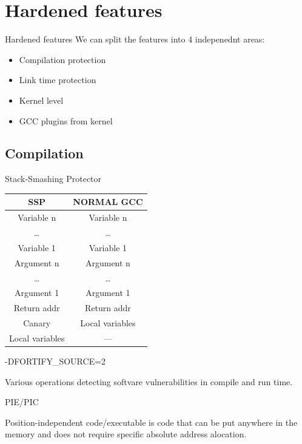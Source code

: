 \documentclass{beamer}
\begin{document}
\section{Hardened features}

\begin{frame}{Hardened features}
	We can split the features into 4 indepenednt areas:
	\begin{itemize}
		\item Compilation protection
		\item Link time protection
		\item Kernel level
		\item GCC plugins from kernel
	\end{itemize}
\end{frame}

\subsection{Compilation}

\begin{frame}{Stack-Smashing Protector}
	\begin{center}
	\begin{tabular}{|c|c|}
		\hline
		SSP & NORMAL GCC \\
		\hline
		Variable n & Variable n \\
		\ldots & \ldots \\
		Variable 1 & Variable 1 \\
		Argument n & Argument n \\
		\ldots & \ldots \\
		Argument 1 & Argument 1 \\
		Return addr & Return addr \\
		Canary & Local variables \\
		Local variables & --- \\
		\hline
	\end{tabular}
	\end{center}
\end{frame}

\begin{frame}{-DFORTIFY\_SOURCE=2}
	\begin{center}
		Various operations detecting softvare vulnerabilities in compile and run time.
	\end{center}
\end{frame}

\begin{frame}{PIE/PIC}
	\begin{center}
	Position-independent code/executable is code that can be put anywhere in the memory and does not require specific absolute address alocation.
	\end{center}
\end{frame}
\end{document}
